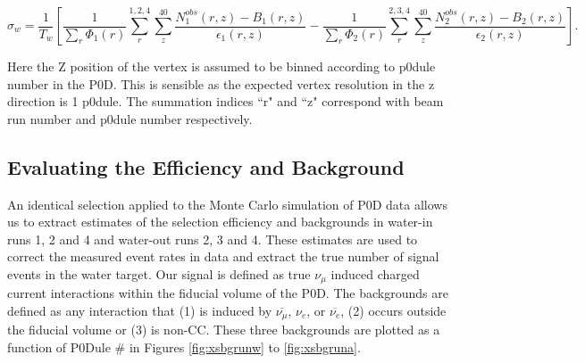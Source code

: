 \begin{equation}
\sigma_w = \frac{1}{T_w}\left[\frac{1}{\sum\limits_r \Phi_1(r)}\sum\limits_{r}^{1,2,4} \sum\limits_{z}^{40} \frac{N^{obs}_1(r,z)-B_1(r,z)}{\epsilon_1(r,z)}-\frac{1}{\sum\limits_r \Phi_2(r)}\sum\limits_{r}^{2,3,4} \sum\limits_{z}^{40} \frac{N^{obs}_2(r,z)-B_2(r,z)}{\epsilon_2(r,z)}\right].
\label{eqn:xsec6}
\end{equation}

Here the Z position of the vertex is assumed to be binned according to p0dule number in the P0D. This is sensible as the expected vertex resolution in the z direction is 1 p0dule. The summation indices ``r" and ``z" correspond with beam run number and p0dule number respectively.

\subsection{Evaluating the Efficiency and Background}

An identical selection applied to the Monte Carlo simulation of P0D
data allows us to extract estimates of the selection efficiency and
backgrounds in water-in runs 1, 2 and 4 and water-out runs 2, 3 and 4. These estimates are used to correct the measured event rates in data and extract the true number of signal events in the water target. Our signal is defined as true $\nu_\mu$ induced charged
current interactions within the fiducial volume of the P0D. The backgrounds are defined as any interaction that (1) is induced by $\overline{\nu_\mu}$,
$\nu_e$, or $\overline{\nu_e}$, (2) occurs outside the fiducial volume or (3)
is non-CC. These three backgrounds are plotted as a function of P0Dule \# in Figures \ref{fig:xsbgrunw} to \ref{fig:xsbgruna}.


